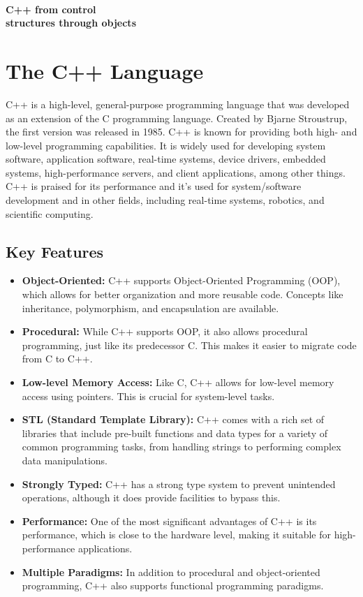 \documentclass{report}
\begin{document}
    \pagebreak \bigbreak \noindent 
    \vspace{2.2in} \\
    \begin{Huge}
        \textbf{C++ from control \\ structures through objects}
    \end{Huge}
    \bigbreak \noindent 
    
    \bigbreak \noindent 
    \section{\LARGE The C++ Language}
    \bigbreak \noindent 
    C++ is a high-level, general-purpose programming language that was developed as an extension of the C programming language. Created by Bjarne Stroustrup, the first version was released in 1985. C++ is known for providing both high- and low-level programming capabilities. It is widely used for developing system software, application software, real-time systems, device drivers, embedded systems, high-performance servers, and client applications, among other things. C++ is praised for its performance and it's used for system/software development and in other fields, including real-time systems, robotics, and scientific computing.
    \bigbreak \noindent 
    \subsection{Key Features}
    \bigbreak \noindent 
    \begin{itemize}
        \item \textbf{Object-Oriented:} C++ supports Object-Oriented Programming (OOP), which allows for better organization and more reusable code. Concepts like inheritance, polymorphism, and encapsulation are available.
        \item \textbf{Procedural:} While C++ supports OOP, it also allows procedural programming, just like its predecessor C. This makes it easier to migrate code from C to C++.
        \item \textbf{Low-level Memory Access:} Like C, C++ allows for low-level memory access using pointers. This is crucial for system-level tasks.
        \item \textbf{STL (Standard Template Library):} C++ comes with a rich set of libraries that include pre-built functions and data types for a variety of common programming tasks, from handling strings to performing complex data manipulations.
        \item \textbf{Strongly Typed:} C++ has a strong type system to prevent unintended operations, although it does provide facilities to bypass this.
        \item \textbf{Performance:} One of the most significant advantages of C++ is its performance, which is close to the hardware level, making it suitable for high-performance applications.
        \item \textbf{Multiple Paradigms:} In addition to procedural and object-oriented programming, C++ also supports functional programming paradigms.
    \end{itemize}
\end{document}
